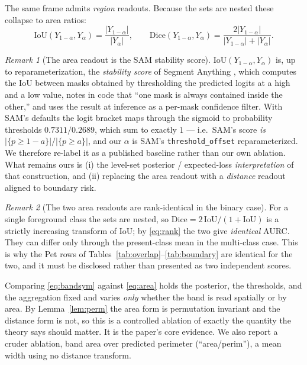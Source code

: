 \documentclass[11pt]{article}
\theoremstyle{remark}
\newtheorem{remark}{Remark}
\newcommand{\Ylo}{Y_{\alpha}}
\newcommand{\Yhi}{Y_{1-\alpha}}
\newcommand{\Dice}{\mathrm{Dice}}
\newcommand{\IoU}{\mathrm{IoU}}
\begin{document}
The same frame admits \emph{region} readouts. Because the sets are nested these
collapse to area ratios:
\begin{equation}\label{eq:area}
\IoU(\Yhi,\Ylo) = \frac{|\Yhi|}{|\Ylo|},
\qquad
\Dice(\Yhi,\Ylo) = \frac{2|\Yhi|}{|\Yhi|+|\Ylo|} .
\end{equation}

\begin{remark}[The area readout is the SAM stability score]\label{rem:sam}
$\IoU(\Yhi,\Ylo)$ is, up to reparameterization, the \emph{stability score} of
Segment Anything \cite{sam}, which computes the IoU between masks obtained by
thresholding the predicted logits at a high and a low value, notes in code that
``one mask is always contained inside the other,'' and uses the result at inference
as a per-mask confidence filter. With SAM's defaults the logit bracket maps through
the sigmoid to probability thresholds $0.7311/0.2689$, which sum to exactly $1$ ---
i.e.\ SAM's score \emph{is} $|\{p\ge 1-a\}|/|\{p\ge a\}|$, and our $\alpha$ is SAM's
\texttt{threshold\_offset} reparameterized. We therefore re-label it as a published
baseline rather than our own ablation. What remains ours is (i) the level-set
posterior / expected-loss \emph{interpretation} of that construction, and (ii)
replacing the area readout with a \emph{distance} readout aligned to boundary risk.
\end{remark}

\begin{remark}[The two area readouts are rank-identical in the binary case]
For a single foreground class the sets are nested, so
$\Dice = 2\,\IoU/(1+\IoU)$ is a strictly increasing transform of $\IoU$; by
\eqref{eq:rank} the two give \emph{identical} AURC. They can differ only through
the present-class mean in the multi-class case. This is why the Pet rows of
Tables~\ref{tab:overlap}--\ref{tab:boundary} are identical for the two, and it must
be disclosed rather than presented as two independent scores.
\end{remark}

Comparing \eqref{eq:bandsym} against \eqref{eq:area} holds the posterior, the
thresholds, and the aggregation fixed and varies \emph{only} whether the band is
read spatially or by area. By Lemma~\ref{lem:perm} the area form is permutation
invariant and the distance form is not, so this is a controlled ablation of exactly
the quantity the theory says should matter. It is the paper's core evidence. We also
report a cruder ablation, band area over predicted perimeter (``area/perim''), a mean
width using no distance transform.
\end{document}
